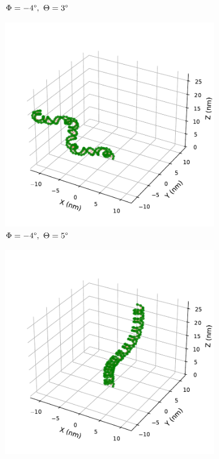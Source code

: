 \documentclass[a4paper,10pt]{article}
\begin{document}
\begin{figure}[htbp]
\begin{subfigure}{0.3\textwidth}
\caption{$\Phi=-4\degree,\ \Theta=3\degree$}
\label{fig:bend_b}
\end{subfigure}
\begin{subfigure}{0.3\textwidth}
\includegraphics[width=\textwidth]{bw_-4_5.pdf}
\caption{$\Phi=-4\degree,\ \Theta=5\degree$}
\label{fig:bend_c}
\end{subfigure}
\begin{subfigure}{0.3\textwidth}
\includegraphics[width=\textwidth]{bw_4_1.pdf}

\end{subfigure}
\end{figure}
\end{document}

